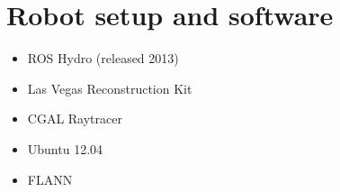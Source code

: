 \documentclass[Thesis.tex]{subfiles}
\begin{document}
\chapter{Robot setup and software}

\begin{itemize}
  \item ROS Hydro (released 2013)
  \item Las Vegas Reconstruction Kit
  \item CGAL Raytracer
  \item Ubuntu 12.04 
  \item FLANN
\end{itemize}
\end{document}
